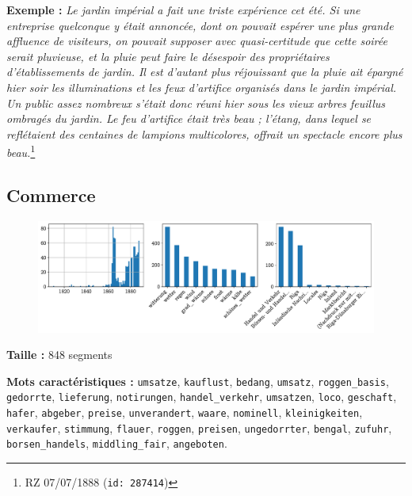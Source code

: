 \documentclass[a4paper,twoside,12pt]{article}
\begin{document}
\noindent \textbf{Exemple :} \textit{Le jardin impérial a fait une triste expérience cet été. Si une entreprise quelconque y était annoncée, dont on pouvait espérer une plus grande affluence de visiteurs, on pouvait supposer avec quasi-certitude que cette soirée serait pluvieuse, et la pluie peut faire le désespoir des propriétaires d'établissements de jardin. Il est d'autant plus réjouissant que la pluie ait épargné hier soir les illuminations et les feux d'artifice organisés dans le jardin impérial. Un public assez nombreux s'était donc réuni hier sous les vieux arbres feuillus ombragés du jardin. Le feu d'artifice était très beau ; l'étang, dans lequel se reflétaient des centaines de lampions multicolores, offrait un spectacle encore plus beau.}\footnote{RZ 07/07/1888 (\texttt{id: 287414})}

\clearpage

\subsection{Commerce} \label{topic4_commerce}

\begin{figure}[H]
\centering
\includegraphics[width=\textwidth]{images/topic_charts_4.pdf}
\end{figure}

\begin{flushleft}
\textbf{Taille :} 848 segments

\textbf{Mots caractéristiques :} \texttt{umsatze}, \texttt{kauflust}, \texttt{bedang}, \texttt{umsatz}, \texttt{roggen\_basis}, \texttt{gedorrte}, \texttt{lieferung}, \texttt{notirungen}, \texttt{handel\_verkehr}, \texttt{umsatzen}, \texttt{loco}, \texttt{geschaft}, \texttt{hafer}, \texttt{abgeber}, \texttt{preise}, \texttt{unverandert}, \texttt{waare}, \texttt{nominell}, \texttt{kleinigkeiten}, \texttt{verkaufer}, \texttt{stimmung}, \texttt{flauer}, \texttt{roggen}, \texttt{preisen}, \texttt{ungedorrter}, \texttt{bengal}, \texttt{zufuhr}, \texttt{borsen\_handels}, \texttt{middling\_fair}, \texttt{angeboten}.
\end{flushleft}
\end{document}
